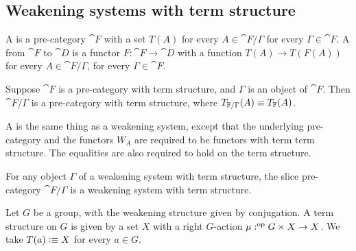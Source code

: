 \begin{comment}
\begin{eg}
In a poset with meets, the functions $W_{a,b}:{\downarrow}(b)\to{\downarrow}(a)$
given by $W_{a,b}(x)\defeq a\land x$ assemble a weakening structure, because for
any $a\leq b$ and $x,c'\leq c\leq b$ we have $a\land(c'\land x)\jdeq (a\land c')\land
(a\land x)$.  
\end{eg}

\begin{eg}
Consider the poset $(\N,\geq)$, which has a morphism from $a$ to $b$ if $a\geq b$.
On this poset, we may consider the weakening structure defined by $W_{a,b}(x)\jdeq
a+(x-b)$.
\end{eg}
\end{comment}

\subsection{Weakening systems with term structure}
\begin{defn}
A  is a pre-category $\cat{F}$ with a set $T(A)$ for every
$A\in\cat{F}/\Gamma$ for every $\Gamma\in\cat{F}$. A  from $\cat{F}$ to $\cat{D}$
is a functor $F:\cat{F}\to\cat{D}$ with a function $T(A)\to T(F(A))$ for
every $A\in\cat{F}/\Gamma$, for every $\Gamma\in\cat{F}$.
\end{defn}

\begin{defn}
Suppose $\cat{F}$ is a pre-category with term structure, and $\Gamma$ is an object of $\cat{F}$. 
Then $\cat{F}/\Gamma$ is a pre-category with term structure, where $T_{\mathbb{F}/\Gamma}(A)\equiv T_\mathbb{F}(A)$.
\end{defn}

\begin{defn}
A  is the same thing as a weakening system,
except that the underlying pre-category and the functors $W_A$ are required to
be functors with term term structure. The equalities are also required to hold on the term structure.
\end{defn}

\begin{cor}
For any object $\Gamma$ of a weakening system with term structure, the slice pre-category
$\cat{F}/\Gamma$ is a weakening system with term structure.
\end{cor}

\begin{eg}

Let $G$ be a group, with the weakening structure given by conjugation. A term
structure on $G$ is given by a set $X$ with a right $G$-action $\mu:^{\mathrm{op}} G\times X\to X$.
We take $T(a)\vcentcolon\equiv X$ for every $a\in G$.
\end{eg}

